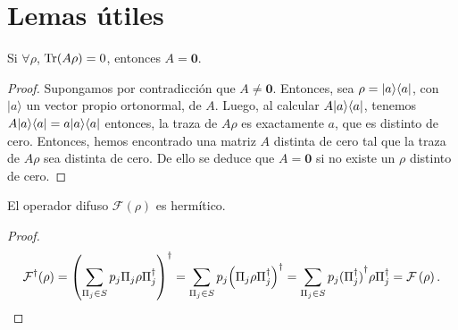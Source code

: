 \section{Lemas útiles}
\begin{lemma}\label{lemma_traza_cero} Si $\forall\rho$, ${\rm Tr}(A\rho)=0$, entonces $A=\mathbf{0}$.\end{lemma}\begin{proof} Supongamos por contradicción que $A\ne \mathbf{0}$. Entonces, sea $\rho=|a\rangle \langle a|$, con $|a\rangle$ un vector propio ortonormal, de $A$. Luego, al calcular $A|a\rangle \langle a|$, tenemos $A|a\rangle \langle a|=a|a\rangle \langle a|$ entonces, la traza  de $A\rho$ es exactamente $a$, que es distinto de cero.
Entonces, hemos encontrado una matriz $A$ distinta de cero tal que la traza de $A\rho$ sea distinta de cero. De ello se deduce que $A = \mathbf{0}$ si no existe un $\rho$ distinto de cero.\end{proof}
 
\begin{comment}
\section{Prueba de las características de los efectos propuestos}

\begin{enumerate}
    \item Son operadores hermíticos\[{\left(\sum_{\Pi \in S} p_\Pi \Pi(P_{\lambda_i})\right)}^\dagger =\sum_{\Pi \in S} p_\Pi {\left(\Pi(P_{\lambda_i})\right)}^\dagger = \sum_{\Pi \in S} p_\Pi \Pi(P_{\lambda_i}).\]
    \item Cumplen con la ecuación de completitud \[\sum_{\lambda_i \in \Lambda}\sum_{\Pi \in S} p_\Pi \Pi(P_{\lambda_i})=\]
\end{enumerate}
\end{comment}

\begin{lemma}\label{lemma:op-difuso-hermiticidad} El operador difuso $\mathcal{F}(\rho)$ es hermítico.
\end{lemma}

\begin{proof}
 \[\mathcal{F}^\dagger{(\rho)}={\left(\sum_{\Pi_j \in S} p_j \Pi_{j}\rho\Pi_{j}^{\dagger}\right)}^\dagger =\sum_{\Pi_j \in S} p_j{\left(\Pi_{j}\rho\Pi_{j}^{\dagger}\right)}^\dagger=\sum_{\Pi_j \in S} p_j {(\Pi_{j}^\dagger)}^\dagger \rho\Pi_{j}^\dagger= \mathcal{F}\left(\rho\right).\]
\end{proof}

 
